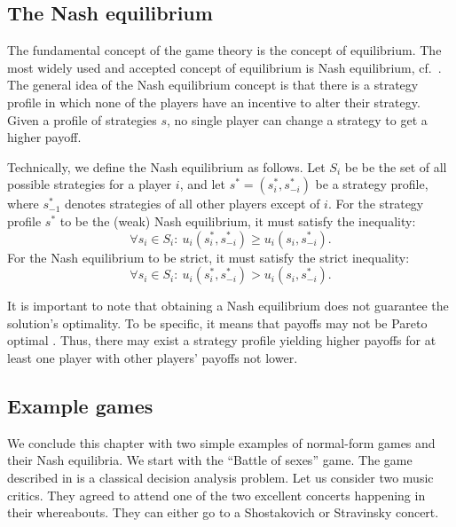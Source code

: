 \documentclass[english, twoside, 12pt, a4paper]{article}
\theoremstyle{definition}
\theoremstyle{plain}
\theoremstyle{remark}
\begin{document}
\subsection{The Nash equilibrium}

The fundamental concept of the game theory is the concept of equilibrium. The most widely used and accepted concept of equilibrium is Nash equilibrium, cf.~\cite{nash1951non}. The general idea of the Nash equilibrium concept is that there is a strategy profile in which none of the players have an incentive to alter their strategy. Given a profile of strategies \(s\), no single player can change a strategy to get a higher payoff.

Technically, we define the Nash equilibrium as follows. Let $S_i$ be be the set of all possible strategies for a player $i$, and let $s^* = (s^*_i, s_{-i}^*)$ be a strategy profile, where $s_{-1}^*$ denotes strategies of all other players except of $i$. For the strategy profile $s^*$ to be the (weak) Nash equilibrium, it must satisfy the inequality:
\[
\forall s_i \in S_i:\:u_i(s_i^*, s_{-i}^*) \geq u_i(s_i, s_{-i}^*).
\]
For the Nash equilibrium to be strict, it must satisfy the strict inequality:
\[
\forall s_i \in S_i:\:u_i(s_i^*, s_{-i}^*) > u_i(s_i, s_{-i}^*).
\]

It is important to note that obtaining a Nash equilibrium does not guarantee the solution's optimality. To be specific, it means that payoffs may not be Pareto optimal \citep{wozny2012lecture}. Thus, there may exist a strategy profile yielding higher payoffs for at least one player with other players' payoffs not lower.

\subsection{Example games}

We conclude this chapter with two simple examples of normal-form games and their Nash equilibria. We start with the \enquote{Battle of sexes} game. The game described in \cite{luce1989games} is a classical decision analysis problem. Let us consider two music critics. They agreed to attend one of the two excellent concerts happening in their whereabouts. They can either go to a Shostakovich or Stravinsky concert. 
\end{document}

